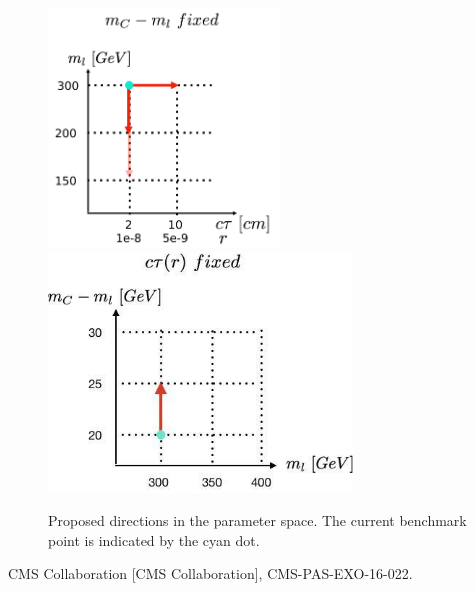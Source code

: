\documentclass[12pt,letterpaper,notitlepage]{article}
\begin{document}
\begin{figure}[H]
\centering
\includegraphics[height=2.5in]{fig-benchmarks/ctau-m.png}
\includegraphics[height=2.5in]{fig-benchmarks/m-splitting.jpg}
\caption{\label{fig:first-benchmarks} Proposed directions in the parameter space. The current benchmark point is indicated by the cyan dot.}
\end{figure}

\begin{thebibliography}{6}

    CMS Collaboration [CMS Collaboration],
    CMS-PAS-EXO-16-022.


\end{thebibliography}
\end{document}
